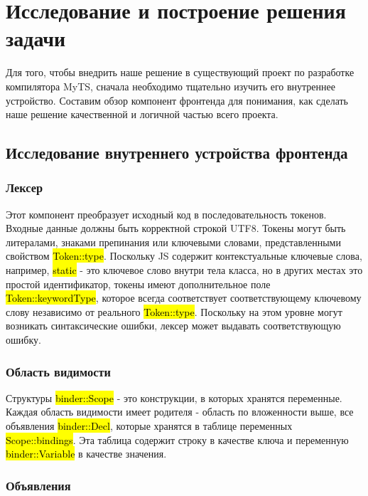 \section{Исследование и построение решения задачи}
\label{sec:Chapter3} 

Для того, чтобы внедрить наше решение в существующий проект по разработке компилятора MyTS,
сначала необходимо тщательно изучить его внутреннее устройство.
Составим обзор компонент фронтенда для понимания, как сделать наше решение качественной и логичной частью всего проекта.

\subsection{Исследование внутреннего устройства фронтенда}

\subsubsection{Лексер}

Этот компонент преобразует исходный код в последовательность токенов.
Входные данные должны быть корректной строкой UTF8.
Токены могут быть литералами, знаками препинания или ключевыми словами, представленными свойством \hl{Token::type}.
Поскольку JS содержит контекстуальные ключевые слова, например, \hl{static} - это ключевое слово внутри тела класса,
но в других местах это простой идентификатор, токены имеют дополнительное поле \hl{Token::keywordType},
которое всегда соответствует соответствующему ключевому слову независимо от реального \hl{Token::type}.
Поскольку на этом уровне могут возникать синтаксические ошибки, лексер может выдавать соответствующую ошибку.

\subsubsection{Область видимости}

Структуры \hl{binder::Scope} - это конструкции, в которых хранятся переменные.
Каждая область видимости имеет родителя - область по вложенности выше, все объявления \hl{binder::Decl},
которые хранятся в таблице переменных \hl{Scope::bindings}.
Эта таблица содержит строку в качестве ключа и переменную \hl{binder::Variable} в качестве значения.

\subsubsection{Объявления}

